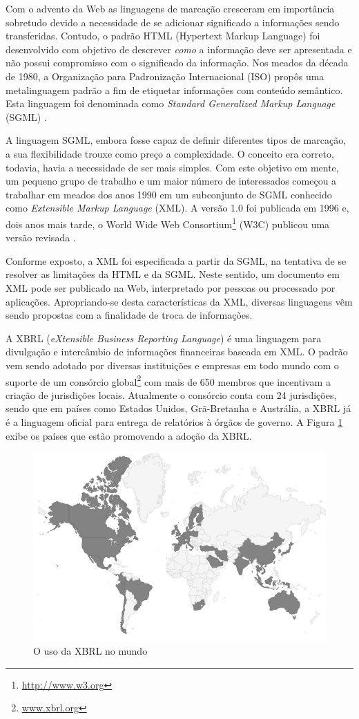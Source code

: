 \documentclass[msc,proposal,hidelot,hideabstract]{ppgccufmg} %
\begin{document}
Com o advento da Web as linguagens de marcação cresceram em importância sobretudo devido a necessidade de se adicionar significado a informações sendo transferidas. Contudo, o padrão HTML (Hypertext
Markup Language) foi desenvolvido com objetivo de descrever \textit{como} a informação deve ser apresentada e não possui compromisso com o significado da informação. Nos meados da década de 1980,  a Organização para Padronização Internacional (ISO) propôs uma metalinguagem padrão a fim de etiquetar informações com conteúdo semântico. Esta linguagem foi denominada como \textit{Standard Generalized Markup Language} (SGML) \cite{smith1988sgml}.

A linguagem SGML, embora fosse capaz de definir diferentes tipos de marcação, a sua flexibilidade trouxe como preço a complexidade. O conceito era correto, todavia, havia a necessidade de ser mais simples. Com este objetivo em mente, um pequeno grupo de trabalho e um maior número de interessados começou a trabalhar em
meados dos anos 1990 em um subconjunto de SGML conhecido como \textit{Extensible Markup Language} (XML). A versão 1.0 foi publicada em 1996 e, dois anos mais tarde, o World Wide Web Consortium\footnote{\url{http://www.w3.org}} (W3C) publicou uma versão revisada \cite{Fawcett:2012:BX:2408362}{}.

Conforme exposto, a XML foi especificada a partir da SGML, na tentativa de se resolver as limitações da HTML
e da SGML. Neste sentido, um documento em XML pode ser publicado na Web, interpretado por pessoas
ou processado por aplicações. Apropriando-se desta características da XML, diversas linguagens vêm sendo propostas com a finalidade de troca de informações.

A XBRL (\textit{eXtensible Business Reporting Language}) é uma linguagem para divulgação e intercâmbio de informações financeiras baseada em XML\cite{xbrl_conceitos_aplicacoes}. O padrão vem sendo adotado por diversas instituições e empresas em todo mundo com o suporte de um consórcio global\footnote{\url{www.xbrl.org}} com mais de 650 membros que incentivam a criação de jurisdições locais. Atualmente o consórcio conta com 24 jurisdições, sendo que em países como  Estados Unidos, Grã-Bretanha e Austrália, a XBRL já é a linguagem oficial para entrega de relatórios à órgãos de governo. A Figura \ref{fig:world_map} exibe os países que estão promovendo a adoção da XBRL.

\begin{figure}[hbtp]
\centering
\includegraphics[width=.75\textwidth]{img/world-map.png}
\caption{O uso da XBRL no mundo}
\label{fig:world_map}
\end{figure}
\end{document}

